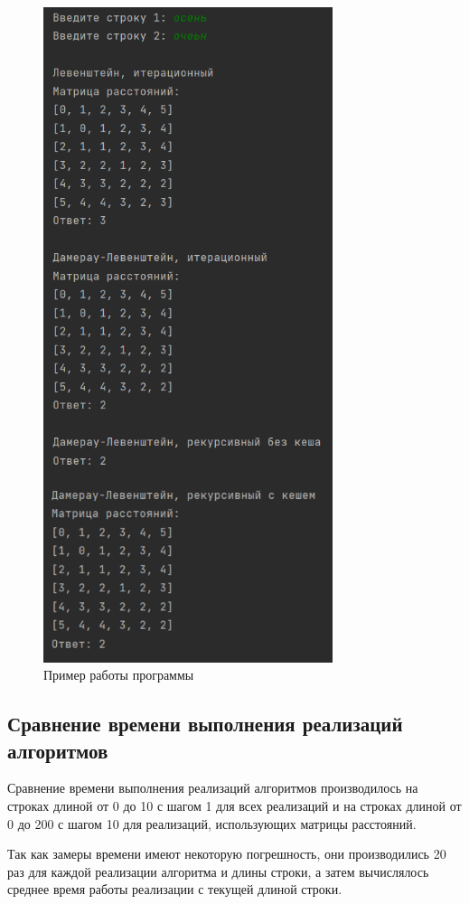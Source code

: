 \begin{figure}[h!btp]
	\centering
	\includegraphics[width=240pt]{inc/program-output.png}
	\caption{Пример работы программы}
	\label{fig:program-output}	
\end{figure}
\clearpage

\subsection{Сравнение времени выполнения реализаций алгоритмов}

Сравнение времени выполнения реализаций алгоритмов производилось на строках длиной от 0 до 10 с шагом 1 для всех реализаций и на строках длиной от 0 до 200 с шагом 10 для реализаций, использующих матрицы расстояний.

Так как замеры времени имеют некоторую погрешность, они производились 20 раз для каждой реализации алгоритма и длины строки, а затем вычислялось среднее время работы реализации с текущей длиной строки. 
 
